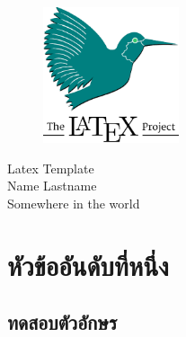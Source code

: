 \documentclass[14pt,a4paper]{extarticle}
\begin{document}
\begin{titlepage}
  \begin{figure}
    \centering
    \includegraphics[width=4cm]{latex.png}
  \end{figure}
  \begin{center}
    \Huge Latex Template \\
    \vspace{5cm} 
    \LARGE Name Lastname \\
    \vfill
    \LARGE Somewhere in the world
    \pagebreak
  \end{center}
\end{titlepage}
%
\tableofcontents
\clearpage
\newpage
\section{หัวข้ออันดับที่หนึ่ง}
\subsection{ทดสอบตัวอักษร}
\lipsum[1] %
\newpage
\end{document}
